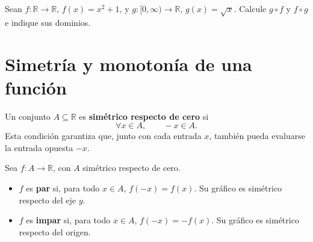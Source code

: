 \documentclass[10pt,a5paper]{article}
\newif\ifmostrarSoluciones
\begin{document}
\begin{ejemplo}
Sean $f:\mathbb{R}\to\mathbb{R}$, $f(x)=x^2+1$, y $g:[0,\infty)\to\mathbb{R}$, $g(x)=\sqrt{x}$. Calcule $g\circ f$ y $f\circ g$ e indique sus dominios.
\end{ejemplo}
\ifmostrarSoluciones
\begin{solucion}
Como $x^2+1\geq1$, se tiene
\[
(g\circ f)(x)=\sqrt{x^2+1},\qquad
\operatorname{Dom}(g\circ f)=\mathbb{R}.
\]
En el otro orden, la función interior exige $x\geq0$:
\[
(f\circ g)(x)=(\sqrt{x})^2+1=x+1,\qquad
\operatorname{Dom}(f\circ g)=[0,\infty).
\]
La simplificación de $(\sqrt{x})^2$ no elimina la restricción original $x\geq0$.
\end{solucion}
\else\vspace{15mm}\fi

\section*{Simetría y monotonía de una función}

\begin{definicion}
Un conjunto $A\subseteq\mathbb{R}$ es \textbf{simétrico respecto de cero} si
\[
\forall x\in A,\qquad -x\in A.
\]
Esta condición garantiza que, junto con cada entrada $x$, también pueda evaluarse la entrada opuesta $-x$.
\end{definicion}

\begin{definicion}
Sea $f:A\to\mathbb{R}$, con $A$ simétrico respecto de cero.
\begin{itemize}
  \item $f$ es \textbf{par} si, para todo $x\in A$, $f(-x)=f(x)$. Su gráfico es simétrico respecto del eje $y$.
  \item $f$ es \textbf{impar} si, para todo $x\in A$, $f(-x)=-f(x)$. Su gráfico es simétrico respecto del origen.
\end{itemize}
\end{definicion}
\end{document}
